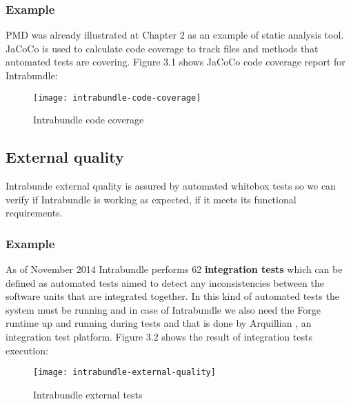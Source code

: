 \subsubsection{Example}
 PMD was already illustrated at Chapter 2 as an example of static analysis tool. JaCoCo is used to calculate code coverage to track files and methods that automated tests are covering. Figure 3.1 shows JaCoCo code coverage report for Intrabundle:

\begin{figure}[h]
\caption{Intrabundle code coverage}
\texttt{[image: intrabundle-code-coverage]}
\end{figure}

\FloatBarrier

\subsection{External quality}
Intrabunde external quality is assured by automated whitebox tests so we can verify if Intrabundle is working as expected, if it meets its functional requirements.

\subsubsection{Example}
As of November 2014 Intrabundle performs 62 \textbf{integration tests} which can be defined as automated tests aimed to detect any inconsistencies between the software units that are integrated together. In this kind of automated tests the system must be running and in case of Intrabundle we also need the Forge runtime up and running during tests and that is done by Arquillian \citep{dan 2011}, an integration test platform. Figure 3.2 shows the result of integration tests execution:

\begin{figure}[h]
\caption{Intrabundle external tests}
\texttt{[image: intrabundle-external-quality]}
\end{figure}

\FloatBarrier